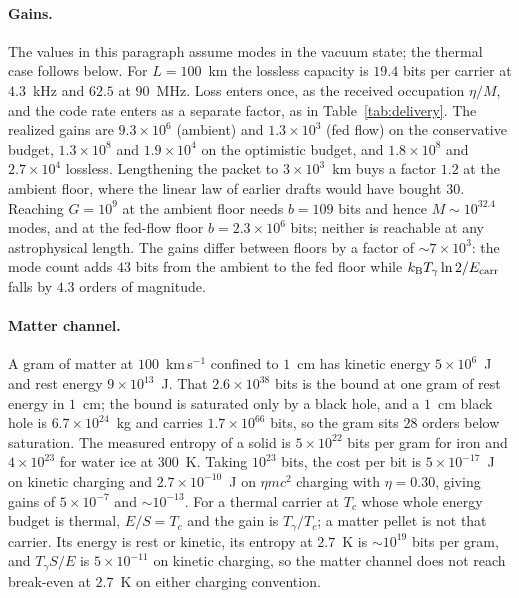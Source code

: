 \documentclass[11pt]{article}
\newcommand{\kb}{\ensuremath{k_{\mathrm{B}}}}
\begin{document}
\paragraph{Gains.} The values in this paragraph assume modes in the vacuum state; the thermal case follows below. For $L = 100$~km the lossless capacity is $19.4$ bits per carrier at $4.3$~kHz and $62.5$ at $90$~MHz. Loss enters once, as the received occupation $\eta/M$, and the code rate enters as a separate factor, as in Table~\ref{tab:delivery}. The realized gains are $9.3\times10^{6}$ (ambient) and $1.3\times10^{3}$ (fed flow) on the conservative budget, $1.3\times10^{8}$ and $1.9\times10^{4}$ on the optimistic budget, and $1.8\times10^{8}$ and $2.7\times10^{4}$ lossless. Lengthening the packet to $3\times10^{3}$~km buys a factor $1.2$ at the ambient floor, where the linear law of earlier drafts would have bought $30$. Reaching $G = 10^{9}$ at the ambient floor needs $b = 109$ bits and hence $M \sim 10^{32.4}$ modes, and at the fed-flow floor $b = 2.3\times10^{6}$ bits; neither is reachable at any astrophysical length. The gains differ between floors by a factor of $\sim 7\times10^{3}$: the mode count adds $43$ bits from the ambient to the fed floor while $\kb T_\gamma \ln 2/E_{\rm carr}$ falls by $4.3$ orders of magnitude.

\paragraph{Matter channel.} A gram of matter at $100$~km\,s$^{-1}$ confined to $1$~cm has kinetic energy $5\times10^{6}$~J and rest energy $9\times10^{13}$~J. That $2.6\times10^{38}$ bits is the bound at one gram of rest energy in $1$~cm; the bound is saturated only by a black hole, and a $1$~cm black hole is $6.7\times10^{24}$~kg and carries $1.7\times10^{66}$ bits, so the gram sits $28$ orders below saturation. The measured entropy of a solid is $5\times10^{22}$ bits per gram for iron and $4\times10^{23}$ for water ice at $300$~K. Taking $10^{23}$ bits, the cost per bit is $5\times10^{-17}$~J on kinetic charging and $2.7\times10^{-10}$~J on $\eta mc^{2}$ charging with $\eta = 0.30$, giving gains of $5\times10^{-7}$ and $\sim 10^{-13}$. For a thermal carrier at $T_c$ whose whole energy budget is thermal, $E/S = T_c$ and the gain is $T_\gamma/T_c$; a matter pellet is not that carrier. Its energy is rest or kinetic, its entropy at $2.7$~K is $\sim 10^{19}$ bits per gram, and $T_\gamma S/E$ is $5\times10^{-11}$ on kinetic charging, so the matter channel does not reach break-even at $2.7$~K on either charging convention.
\end{document}
